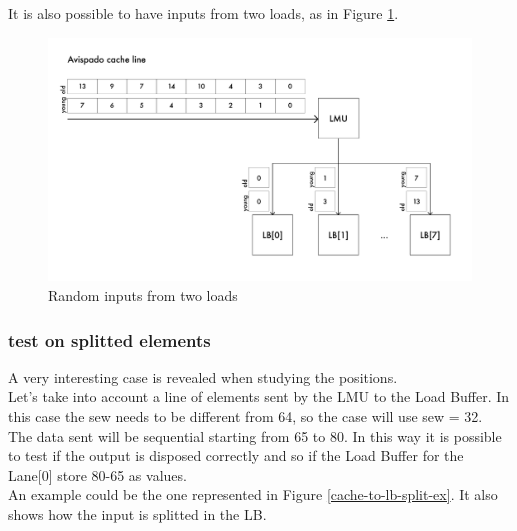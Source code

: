 It is also possible to have inputs from two loads, as in Figure \ref{cache-to-lb-ooo-ex}.

\begin{figure}[H]
    \centering
    \includegraphics[scale = 0.6]{Chapter_2/img/cache-to-lb-ooo-ex.png}
    \caption{Random inputs from two loads}
    \label{cache-to-lb-ooo-ex}
\end{figure}

\subsubsection{test on splitted elements} 
A very interesting case is revealed when studying the positions.\\
Let's take into account a line of elements sent by the LMU to the Load Buffer. In this case the sew needs to be different from 64, so the case will use sew = 32.\\

The data sent will be sequential starting from 65 to 80. In this way it is possible to test if the output is disposed correctly and so if the Load Buffer for the Lane[0] store 80-65 as values.\\

An example could be the one represented in Figure \ref{cache-to-lb-split-ex}. It also shows how the input is splitted in the LB.

